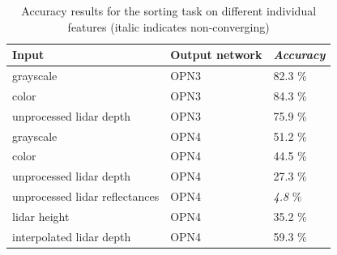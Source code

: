 \begin{table}[]
\centering
\caption{Accuracy results for the sorting task on different individual features (italic indicates non-converging)}
\label{tab:indiv_results}
\begin{tabular}{|p{7.5cm}|p{2cm}|p{2cm}|}
\hline
\textbf{Input}                                                          & \textbf{Output network} & \textit{\textbf{Accuracy}} \\ \hline
grayscale                                                               & OPN3                    & 82.3 \%                   \\ \hline
color                                                                   & OPN3                    & 84.3 \%                   \\ \hline
unprocessed lidar depth                                                 & OPN3                    & 75.9 \%                   \\ \hline
grayscale                                                               & OPN4                    & 51.2 \%                   \\ \hline
color                                                                   & OPN4                    & 44.5 \%                   \\ \hline
unprocessed lidar depth                                                 & OPN4                    & 27.3 \%                   \\ \hline
unprocessed lidar reflectances                                          & OPN4                    & \textit{4.8} \%                   \\ \hline
lidar height                                                            & OPN4                    & 35.2 \%                   \\ \hline
interpolated lidar depth                                                & OPN4                    & 59.3 \%                   \\ \hline
\end{tabular}
\end{table}

